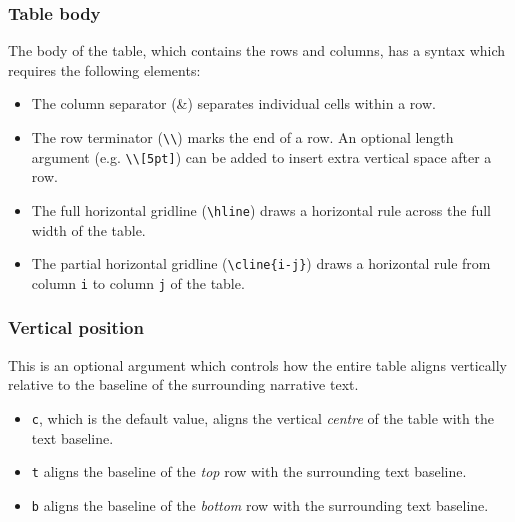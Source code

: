 		\subsubsection{Table body}
			The body of the table, which contains the rows and columns, has a syntax which requires the following elements:
			\begin{itemize}
				\item The column separator (\&) separates individual cells within a row.
				\item The row terminator (\verb|\\|) marks the end of a row. An optional length argument (e.g. \lstinline|\\[5pt]|) can be added to insert extra vertical space after a row.
				\item The full horizontal gridline (\lstinline|\hline|) draws a horizontal rule across the full width of the table.
				\item The partial horizontal gridline (\lstinline|\cline{i-j}|) draws a horizontal rule from column \verb|i| to column \verb|j| of the table.
			\end{itemize}
		
		\subsubsection{Vertical position}
			This is an optional argument which controls how the entire table aligns vertically relative to the baseline of the surrounding narrative text.
			\begin{itemize}
				\item \verb|c|, which is the default value, aligns the vertical \emph{centre} of the table with the text baseline.
				\item \verb|t| aligns the baseline of the \emph{top} row with the surrounding text baseline.
				\item \verb|b| aligns the baseline of the \emph{bottom} row with the surrounding text baseline.
			\end{itemize}
			
